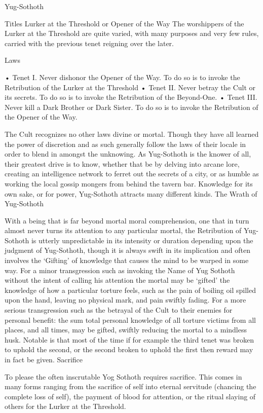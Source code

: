 \documentclass[blue]{guildcamp4}
\begin{document}
\name{\bYog{}}

Yug-Sothoth

Titles Lurker at the Threshold or Opener of the Way
The worshippers of the Lurker at the Threshold are quite varied, with many purposes and very few rules, carried with the previous tenet reigning over the later.

Laws

•	Tenet I. Never dishonor the Opener of the Way. To do so is to invoke the Retribution of the Lurker at the Threshold   
•	Tenet II. Never betray the Cult or its secrets. To do so is to invoke the Retribution of the Beyond-One. 
•	Tenet III. Never kill a Dark Brother or Dark Sister. To do so is to invoke the Retribution of the Opener of the Way. 

The Cult recognizes no other laws divine or mortal. Though they have all learned the power of discretion and as such generally follow the laws of their locale in order to blend in amongst the unknowing. As Yug-Sothoth is the knower of all, their greatest drive is to know, whether that be by delving into arcane lore, creating an intelligence network to ferret out the secrets of a city, or as humble as working the local gossip mongers from behind the tavern bar. Knowledge for its own sake, or for power, Yug-Sothoth attracts many different kinds.
The Wrath of Yug-Sothoth

With a being that is far beyond mortal moral comprehension, one that in turn almost never turns its attention to any particular mortal, the Retribution of Yug-Sothoth is utterly unpredictable in its intensity or duration depending upon the judgment of Yug-Sothoth, though it is always swift in its implication and often involves the ‘Gifting’ of knowledge that causes the mind to be warped in some way. For a minor transgression such as invoking the Name of Yug Sothoth without the intent of calling his attention the mortal may be ‘gifted’ the knowledge of how a particular torture feels, such as the pain of boiling oil spilled upon the hand, leaving no physical mark, and pain swiftly fading. For a more serious transgression such as the betrayal of the Cult to their enemies for personal benefit: the sum total personal knowledge of all torture victims from all places, and all times, may be gifted, swiftly reducing the mortal to a mindless husk. Notable is that most of the time if for example the third tenet was broken to uphold the second, or the second broken to uphold the first then reward may in fact be given.
Sacrifice

To please the often inscrutable Yog Sothoth requires sacrifice. This comes in many forms ranging from the sacrifice of self into eternal servitude (chancing the complete loss of self), the payment of blood for attention, or the ritual slaying of others for the Lurker at the Threshold. 
\end{document}
